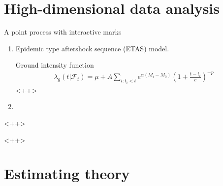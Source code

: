 \documentclass[12pt,a4paper]{book}
\begin{document}
\chapter{High-dimensional data analysis }

\begin{chapter}{A point process with interactive marks}

  \begin{enumerate}
    \item Epidemic type aftershock sequence (ETAS) model. 
      
      Ground intensity function
      \begin{align*}
	\lambda_g(t|\mathcal{F}_t)=\mu+A\sum_{i:t_i<t} e^{\alpha(M_i-M_0)}(1+\frac{t-t_i}{c})^{-p}
      \end{align*}<++>
     
    \item 
  \end{enumerate}<++>

\end{chapter}<++>

\chapter{Estimating theory}



%

\end{document}
